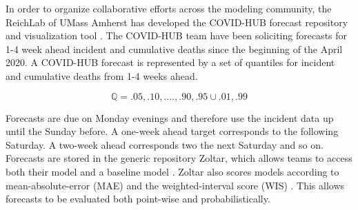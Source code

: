 \documentclass[11pt]{amsart}
\begin{document}
In order to organize collaborative efforts across the modeling community, the ReichLab of UMass Amherst has developed the COVID-HUB forecast repository and visualization tool \cite{COVID-HUB}. The COVID-HUB team have been soliciting forecasts for 1-4 week ahead incident and cumulative deaths since the beginning of the April 2020. A COVID-HUB forecast is represented by a set of quantiles for incident and cumulative deaths from 1-4 weeks ahead. 

\begin{equation}
\mathbb{Q} = {.05,.10,....,.90,.95} \cup {.01,.99}
\end{equation}

Forecasts are due on Monday evenings and therefore use the incident data up until the Sunday before. A one-week ahead target corresponds to the following Saturday. A two-week ahead corresponds two the next Saturday and so on. Forecasts are stored in the generic repository Zoltar, which allows teams to access both their model and a baseline model \cite{reich2020zoltar}. Zoltar also scores models according to mean-absolute-error (MAE) and the weighted-interval score (WIS) \cite{bracher2020evaluating}. This allows forecasts to be evaluated both point-wise and probabilistically. 
\end{document}

